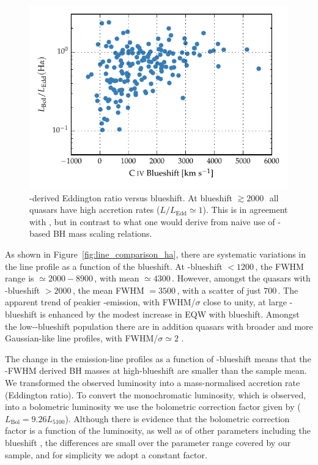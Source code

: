 \begin{figure}
    \centering
    \includegraphics[width=0.8\linewidth]{figures/chapter03/ha_edd_civ_bs.pdf}
    \caption[{\hans-derived Eddington ratio versus  blueshift.}]{\hans-derived Eddington ratio versus  blueshift. At blueshift $\gtrsim2000$\,\kms\, all quasars have high accretion rates ($L/L_{\text{Edd}} \simeq 1$). This is in agreement with \citet{kratzer15}, but in contrast to what one would derive from naive use of -based BH mass scaling relations.}
    \label{fig:ha_edd_civ_bs}
\end{figure}

As shown in Figure~\ref{fig:line_comparison_ha}, there are systematic variations in the \ha line profile as a function of the  blueshift. 
At -blueshift $<1200$\,\kms, the \ha FWHM range is $\simeq2000 - 8900$\,\kms, with mean $\simeq4300$\,\kms.
However, amongst the quasars with -blueshift $>2000$\,\kms, the mean \ha FWHM $=3500$\,\kms, with a scatter of just $700$\,\kms. 
The apparent trend of peakier \hans-emission, with FWHM/$\sigma$ close to unity, at large -blueshift is enhanced by the modest increase in \ha EQW with blueshift. 
Amongst the low--blueshift population there are in addition quasars with broader and more Gaussian-like \ha line profiles, with FWHM/$\sigma \simeq 2$ . 

The change in the \ha emission-line profiles as a function of -blueshift means that the \hans-FWHM derived BH masses at high-blueshift are smaller than the sample mean. 
We transformed the observed luminosity into a mass-normalised accretion rate (Eddington ratio).
To convert the monochromatic luminosity, which is observed, into a bolometric luminosity we use the bolometric correction factor given by \citet{richards06} ($L_{\text{Bol}} = 9.26L_{5100}$).
Although there is evidence that the bolometric correction factor is a function of the luminosity, as well as of other parameters including the  blueshift \citep{krawczyk13}, the differences are small over the parameter range covered by our sample, and for simplicity we adopt a constant factor. 

